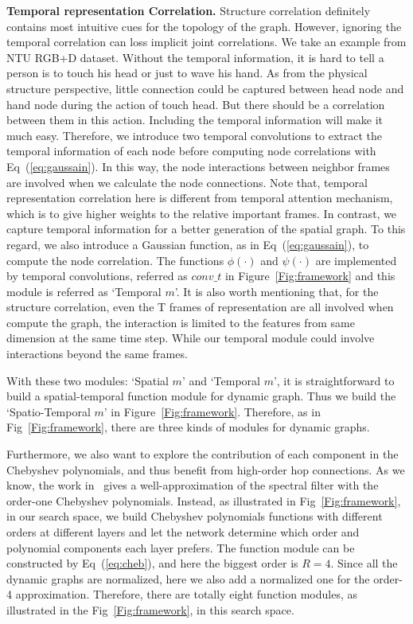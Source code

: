 \documentclass[letterpaper]{article} \usepackage{aaai19}  \usepackage{times}  \usepackage{helvet} \usepackage{courier}  \usepackage[hyphens]{url}  \usepackage{graphicx} \urlstyle{rm} \def\UrlFont{\rm}  \usepackage{graphicx}  \frenchspacing  \setlength{\pdfpagewidth}{8.5in}  \setlength{\pdfpageheight}{11in}
\begin{document}
\noindent\textbf{Temporal representation Correlation.} Structure correlation definitely contains most intuitive cues for the topology of the graph. However, ignoring the temporal correlation can loss implicit joint correlations. We take an example from NTU RGB+D dataset. Without the temporal information, it is hard to tell a person is to touch his head or just to wave his hand. As from the physical structure perspective, little connection could be captured between head node and hand node during the action of touch head. But there should be a correlation between them in this action. Including the temporal information will make it much easy. Therefore, we introduce two temporal convolutions to extract the temporal information of each node before computing node correlations with Eq~(\ref{eq:gaussain}). In this way, the node interactions between neighbor frames are involved when we calculate the node connections. Note that, temporal representation correlation here is different from temporal attention mechanism, which is to give higher weights to the relative important frames. In contrast, we capture temporal information for a better generation of the spatial graph. To this regard, we also introduce a Gaussian function, as in Eq~(\ref{eq:gaussain}), to compute the node correlation. The functions $\phi(\cdot)$ and $\psi(\cdot)$ are implemented by temporal convolutions, referred as $conv\_t$ in Figure~\ref{Fig:framework} and this module is referred as `Temporal $m$'. It is also worth mentioning that, for the structure correlation, even the T frames of representation are all involved when compute the graph, the interaction is limited to the features from same dimension at the same time step. While our temporal module could involve interactions beyond the same frames.

With these two modules: `Spatial $m$' and `Temporal $m$', it is straightforward to build a spatial-temporal function module for dynamic graph. Thus we build the `Spatio-Temporal $m$' in Figure~\ref{Fig:framework}. Therefore, as in Fig~\ref{Fig:framework}, there are three kinds of modules for dynamic graphs. 

Furthermore, we also want to explore the contribution of each component in the Chebyshev polynomials, and thus benefit from high-order hop connections. As we know, the work in~\cite{kipf2016semi} gives a well-approximation of the spectral filter with the order-one Chebyshev polynomials. Instead, as illustrated in Fig~\ref{Fig:framework}, in our search space, we build Chebyshev polynomials functions with different orders at different layers and let the network determine which order and polynomial components each layer prefers. The function module can be constructed by Eq~(\ref{eq:cheb}), and here the biggest order is $R=4$. Since all the dynamic graphs are normalized, here we also add a normalized one for the order-4 approximation. Therefore, there are totally eight function modules, as illustrated in the Fig~\ref{Fig:framework}, in this search space. 
\end{document}
